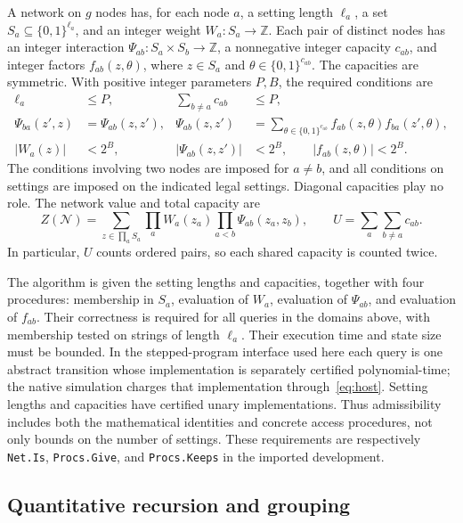 \documentclass[11pt,reqno]{amsart}
\numberwithin{equation}{section}
\theoremstyle{definition}
\theoremstyle{remark}
\newcommand{\Z}{\mathbb Z}
\begin{document}
A network on $g$ nodes has, for each node $a$, a setting length $\ell_a$, a set $S_a\subseteq\{0,1\}^{\ell_a}$, and an integer weight $W_a:S_a\to\Z$. Each pair of distinct nodes has an integer interaction $\Psi_{ab}:S_a\times S_b\to\Z$, a nonnegative integer capacity $c_{ab}$, and integer factors $f_{ab}(z,\theta)$, where $z\in S_a$ and $\theta\in\{0,1\}^{c_{ab}}$. The capacities are symmetric. With positive integer parameters $P,B$, the required conditions are
\begin{align}
 \ell_a&\le P,& \sum_{b\ne a}c_{ab}&\le P,\label{eq:net-row}\\
 \Psi_{ba}(z',z)&=\Psi_{ab}(z,z'),&
 \Psi_{ab}(z,z')&=\sum_{\theta\in\{0,1\}^{c_{ab}}}
                  f_{ab}(z,\theta)f_{ba}(z',\theta),\label{eq:net-factor}\\
 |W_a(z)|&<2^B,& |\Psi_{ab}(z,z')|&<2^B,\qquad |f_{ab}(z,\theta)|<2^B.\label{eq:net-magnitude}
\end{align}
The conditions involving two nodes are imposed for $a\ne b$, and all conditions on settings are imposed on the indicated legal settings. Diagonal capacities play no role. The network value and total capacity are
\begin{equation}\label{eq:net-value}
 Z(\mathcal N)=\sum_{z\in\prod_a S_a}
       \prod_a W_a(z_a)\prod_{a<b}\Psi_{ab}(z_a,z_b),
 \qquad U=\sum_a\sum_{b\ne a}c_{ab}.
\end{equation}
In particular, $U$ counts ordered pairs, so each shared capacity is counted twice.

The algorithm is given the setting lengths and capacities, together with four procedures: membership in $S_a$, evaluation of $W_a$, evaluation of $\Psi_{ab}$, and evaluation of $f_{ab}$. Their correctness is required for all queries in the domains above, with membership tested on strings of length $\ell_a$. Their execution time and state size must be bounded. In the stepped-program interface used here each query is one abstract transition whose implementation is separately certified polynomial-time; the native simulation charges that implementation through~\eqref{eq:host}. Setting lengths and capacities have certified unary implementations. Thus admissibility includes both the mathematical identities and concrete access procedures, not only bounds on the number of settings. These requirements are respectively \texttt{Net.Is}, \texttt{Procs.Give}, and \texttt{Procs.Keeps} in the imported development.

\subsection{Quantitative recursion and grouping}
\end{document}
